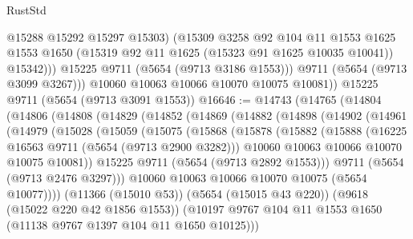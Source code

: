 \begin{lexlean}{RustStd}
\begin{coremodule}
                  @15288
                  @15292
                  @15297
                  @15303)
                (@15309
                  @3258
                  @92
                  @104
                  @11
                  @1553
                  @1625
                  @1553
                  @1650
                  (@15319 @92 @11 @1625 (@15323 @91 @1625 @10035 @10041))
                  @15342)))
            @15225
            @9711
            (@5654 (@9713 @3186 @1553)))
          @9711
          (@5654 (@9713 @3099 @3267)))
        @10060
        @10063
        @10066
        @10070
        @10075
        @10081))
    @15225
    @9711
    (@5654 (@9713 @3091 @1553))
@16646 := @14743
    (@14765
      (@14804
        (@14806
          (@14808
            (@14829
              (@14852
                (@14869
                  (@14882
                    (@14898
                      (@14902
                        (@14961
                          (@14979
                            (@15028
                              (@15059
                                (@15075
                                  (@15868
                                    (@15878
                                      (@15882
                                        (@15888
                                          (@16225 @16563 @9711 (@5654 (@9713 @2900 @3282)))
                                          @10060
                                          @10063
                                          @10066
                                          @10070
                                          @10075
                                          @10081))
                                      @15225
                                      @9711
                                      (@5654 (@9713 @2892 @1553)))
                                    @9711
                                    (@5654 (@9713 @2476 @3297)))
                                  @10060
                                  @10063
                                  @10066
                                  @10070
                                  @10075
                                  (@5654 @10077))))
                            (@11366 (@15010 @53))
                            (@5654 (@15015 @43 @220))
                            (@9618 (@15022 @220 @42 @1856 @1553))
                            (@10197
                              @9767
                              @104
                              @11
                              @1553
                              @1650
                              (@11138 @9767 @1397 @104 @11 @1650 @10125)))

\end{coremodule}
\end{lexlean}
